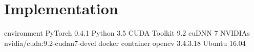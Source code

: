 \chapter{Implementation}
\label{app:impl}

environment
PyTorch 0.4.1
Python 3.5
CUDA Toolkit 9.2
cuDNN 7
NVIDIAs nvidia/cuda:9.2-cudnn7-devel docker container
opencv 3.4.3.18
Ubuntu 16.04

